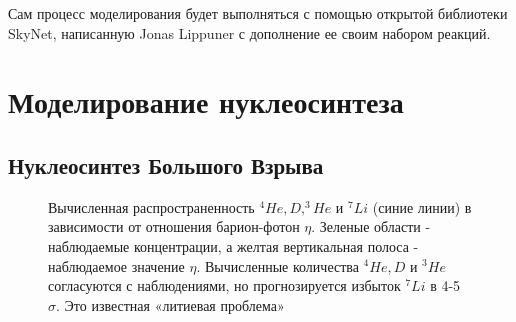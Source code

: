 \documentclass[14pt, a4paper]{article}
\numberwithin{figure}{section}
\numberwithin{equation}{section}
\begin{document}
Сам процесс моделирования будет выполняться с помощью открытой библиотеки SkyNet, 
написанную Jonas Lippuner с дополнение ее своим набором реакций.

\section{Моделирование нуклеосинтеза}

\subsection{Нуклеосинтез Большого Взрыва}

\begin{figure}[ht]
	\caption{Вычисленная распространенность $^4He, D, ^3He$ и $^7Li$ (синие линии) в зависимости от отношения барион-фотон $\eta$. Зеленые области - наблюдаемые концентрации, а желтая вертикальная полоса - наблюдаемое значение $\eta$. Вычисленные количества $^4He, D$ и $^3He$ согласуются с наблюдениями, но прогнозируется избыток $^7Li$ в 4-5 $\sigma$. Это известная «литиевая проблема»}
	\label{ris:Cocetal}
\end{figure}
\end{document}
